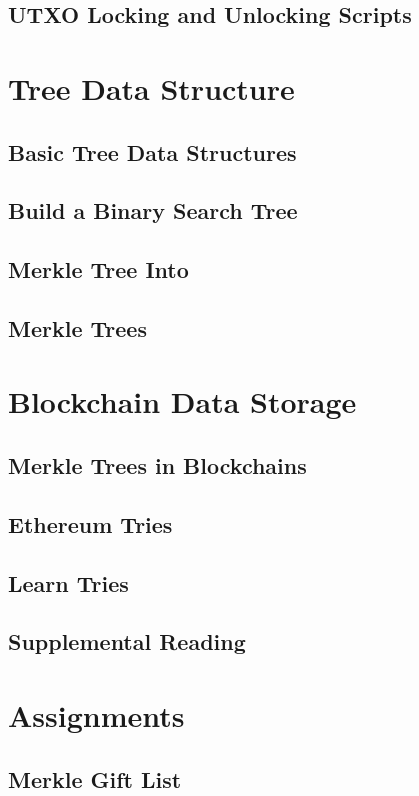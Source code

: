 \documentclass[a4paper, oneside]{book}
\begin{document}
\subsection{UTXO Locking and Unlocking Scripts}

\section{Tree Data Structure}
\subsection{Basic Tree Data Structures}
\subsection{Build a Binary Search Tree}
\subsection{Merkle Tree Into}
\subsection{Merkle Trees}

\section{Blockchain Data Storage}
\subsection{Merkle Trees in Blockchains}
\subsection{Ethereum Tries}
\subsection{Learn Tries}
\subsection{Supplemental Reading}

\section{Assignments}
\subsection{Merkle Gift List}
\end{document}
